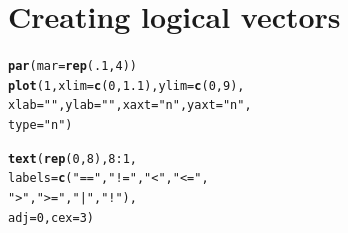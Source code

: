 \documentclass{tufte-book}\usepackage[]{graphicx}\usepackage[]{color}
\makeatletter
\newcommand{\hlnum}[1]{\textcolor[rgb]{0.686,0.059,0.569}{#1}}%
\newcommand{\hlstr}[1]{\textcolor[rgb]{0.192,0.494,0.8}{#1}}%
\newcommand{\hlopt}[1]{\textcolor[rgb]{0,0,0}{#1}}%
\newcommand{\hlstd}[1]{\textcolor[rgb]{0.345,0.345,0.345}{#1}}%
\newcommand{\hlkwc}[1]{\textcolor[rgb]{0.333,0.667,0.333}{#1}}%
\newcommand{\hlkwd}[1]{\textcolor[rgb]{0.737,0.353,0.396}{\textbf{#1}}}%
\newenvironment{kframe}{%
 \def\at@end@of@kframe{}%
 \ifinner\ifhmode%
  \def\at@end@of@kframe{\end{minipage}}%
  \begin{minipage}{\columnwidth}%
 \fi\fi%
 \def\FrameCommand##1{\hskip\@totalleftmargin \hskip-\fboxsep
 \colorbox{shadecolor}{##1}\hskip-\fboxsep
     \hskip-\linewidth \hskip-\@totalleftmargin \hskip\columnwidth}%
 \MakeFramed {\advance\hsize-\width
   \@totalleftmargin\z@ \linewidth\hsize
   \@setminipage}}%
 {\par\unskip\endMakeFramed%
 \at@end@of@kframe}
\newenvironment{knitrout}{}{} %
\makeatother
\begin{document}
\section{Creating logical vectors}


\begin{marginfigure}
\begin{tiny}
\begin{knitrout}
\color{fgcolor}\begin{kframe}
\begin{alltt}
\hlkwd{par}\hlstd{(}\hlkwc{mar} \hlstd{=} \hlkwd{rep}\hlstd{(}\hlnum{.1}\hlstd{,} \hlnum{4}\hlstd{))}
\hlkwd{plot}\hlstd{(}\hlnum{1}\hlstd{,} \hlkwc{xlim} \hlstd{=} \hlkwd{c}\hlstd{(}\hlnum{0}\hlstd{,} \hlnum{1.1}\hlstd{),} \hlkwc{ylim} \hlstd{=} \hlkwd{c}\hlstd{(}\hlnum{0}\hlstd{,} \hlnum{9}\hlstd{),}
     \hlkwc{xlab} \hlstd{=} \hlstr{""}\hlstd{,} \hlkwc{ylab} \hlstd{=} \hlstr{""}\hlstd{,} \hlkwc{xaxt} \hlstd{=} \hlstr{"n"}\hlstd{,} \hlkwc{yaxt} \hlstd{=} \hlstr{"n"}\hlstd{,}
     \hlkwc{type} \hlstd{=} \hlstr{"n"}\hlstd{)}


\hlkwd{text}\hlstd{(}\hlkwd{rep}\hlstd{(}\hlnum{0}\hlstd{,} \hlnum{8}\hlstd{),} \hlnum{8}\hlopt{:}\hlnum{1}\hlstd{,}
     \hlkwc{labels} \hlstd{=} \hlkwd{c}\hlstd{(}\hlstr{"=="}\hlstd{,} \hlstr{"!="}\hlstd{,} \hlstr{"<"}\hlstd{,} \hlstr{"<="}\hlstd{,}
                \hlstr{">"}\hlstd{,} \hlstr{">="}\hlstd{,} \hlstr{"|"}\hlstd{,} \hlstr{"!"}\hlstd{),}
     \hlkwc{adj} \hlstd{=} \hlnum{0}\hlstd{,} \hlkwc{cex} \hlstd{=} \hlnum{3}\hlstd{)}


\end{alltt}
\end{kframe}
\end{knitrout}
\end{tiny}
\end{marginfigure}
\end{document}
